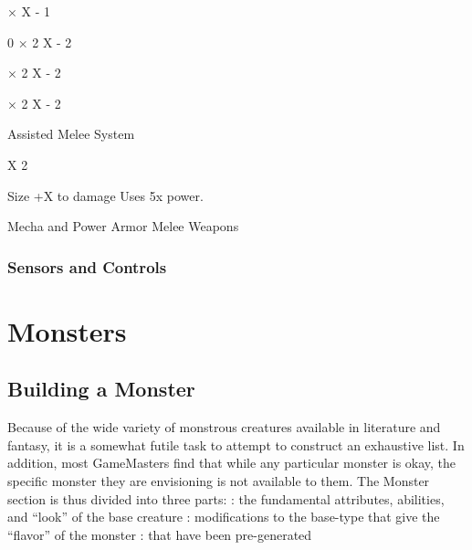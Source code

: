 \documentclass[twoside]{book}
\begin{document}
                         ×      X
                        -    1    
                     
                    
                   0   
                       ×   
                             2      X  
                            -    2   
                            
                    
                       ×   
                             2      X  
                            -    2   
                            
                    
                       ×   
                             2      X  
                            -    2   
                            
                    
                  
                  
                   Assisted Melee System   
                    
                         X    2   
                        
                    
                   Size   
                   +X to damage   
                   Uses 5x power.   
                  
                
              Mecha and Power Armor Melee Weapons  
            
\subsection{Sensors and Controls}
    
\chapter{Monsters}
    
\section{Building a Monster}
     Because of the wide variety of monstrous creatures
             available in literature and fantasy, it is a somewhat futile
             task to attempt to construct an exhaustive list. In
             addition, most GameMasters find that while any particular
             monster is okay, the specific monster they are envisioning
             is not available to them. The Monster section is thus
             divided into three parts:   
               : the fundamental
               attributes, abilities, and “look” of the base
               creature 
               : modifications to the
               base-type that give the “flavor” of the
               monster 
               : that have been
               pre-generated 
          
\end{document}
